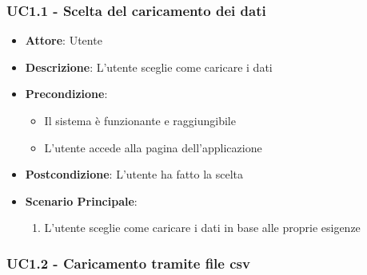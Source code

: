    \subsubsection{UC1.1 - Scelta del caricamento dei dati}
    \label{uc1.1}
    
    \begin{itemize}
    \item \textbf{Attore}: Utente
    \item \textbf{Descrizione}: L'utente sceglie come caricare i dati
    \item \textbf{Precondizione}:
    \begin{itemize}
        \item Il sistema è funzionante e raggiungibile
        \item L'utente accede alla pagina dell'applicazione
    \end{itemize}
    \item \textbf{Postcondizione}: L'utente ha fatto la scelta
    \item \textbf{Scenario Principale}: 
        \begin{enumerate}
            \item L'utente sceglie come caricare i dati in base alle proprie esigenze
        \end{enumerate}
    \end{itemize}
    
    \subsubsection{UC1.2 - Caricamento tramite file csv}
    \label{uc1.2}
    

